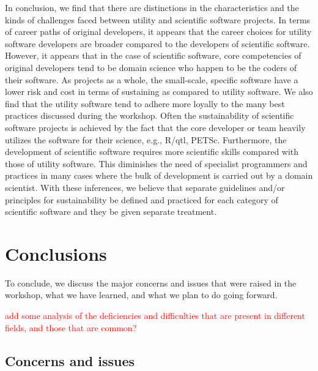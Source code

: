 \documentclass[11pt, oneside]{amsart}
\newcommand{\note}[1]{ {\textcolor{red}    { #1 }}}
\newcommand{\toolname}[1] {\textsf{#1}}
\begin{document}
In conclusion, we find that there are distinctions in the characteristics and
the kinds of challenges faced between utility and scientific software projects.
In terms of career paths of original developers, it appears that the career
choices for utility software developers are broader compared to the developers
of scientific software. However, it appears that in the case of scientific
software, core competencies of original developers tend to be domain science
who happen to be the coders of their software. As projects as a whole, the
small-scale, specific software have a lower risk and cost in terms of
sustaining as compared to utility software. We also find that the utility
software tend to adhere more loyally to the many best practices discussed
during the workshop. Often the sustainability of scientific software projects
is achieved by the fact that the core developer or team heavily utilizes the
software for their science, e.g.,  \toolname{R/qtl, PETSc}.  Furthermore, the
development of scientific software requires more scientific skills compared
with those of utility software. This diminishes the need of specialist
programmers and practices in many cases where the bulk of development is
carried out by a domain scientist. With these inferences, we believe that
separate guidelines and/or principles for sustainability be defined and
practiced for each category of scientific software and they be given separate
treatment.


\section{Conclusions} \label{sec:conclusions}

To conclude, we discuss the major concerns and issues that were raised in
the workshop, what we have learned, and what we plan to do going forward.

\note{add some analysis of the deficiencies and difficulties that are
  present in different fields, and those that are common?}

\subsection{Concerns and issues}
\end{document}
